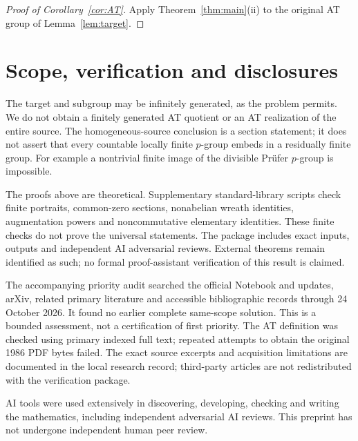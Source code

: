 \documentclass[11pt]{article}
\theoremstyle{definition}
\begin{document}
\begin{proof}[Proof of Corollary~\ref{cor:AT}]
Apply Theorem~\ref{thm:main}(ii) to the original AT group of
Lemma~\ref{lem:target}.
\end{proof}

\section{Scope, verification and disclosures}

The target and subgroup may be infinitely generated, as the problem
permits. We do not obtain a finitely generated AT quotient or an AT
realization of the entire source. The homogeneous-source conclusion
is a section statement; it does not assert that every countable locally
finite \(p\)-group embeds in a residually finite group.
For example a nontrivial finite image of the divisible Pr\"ufer
\(p\)-group is impossible.

The proofs above are theoretical. Supplementary standard-library scripts
check finite portraits, common-zero sections, nonabelian wreath identities,
augmentation powers and noncommutative elementary identities.
These finite checks do not prove the universal statements.
The package includes exact inputs, outputs and independent AI adversarial
reviews. External theorems remain identified as such; no formal
proof-assistant verification of this result is claimed.

The accompanying priority audit searched the official Notebook and
updates, arXiv, related primary literature and accessible bibliographic
records through 24 October 2026. It found no earlier complete same-scope
solution. This is a bounded assessment, not a certification of first
priority. The AT definition was checked using primary indexed full text;
repeated attempts to obtain the original 1986 PDF bytes failed.
The exact source excerpts and acquisition limitations are documented in
the local research record; third-party articles are not redistributed
with the verification package.

AI tools were used extensively in discovering, developing, checking and
writing the mathematics, including independent adversarial AI reviews.
This preprint has not undergone independent human peer review.
\end{document}
